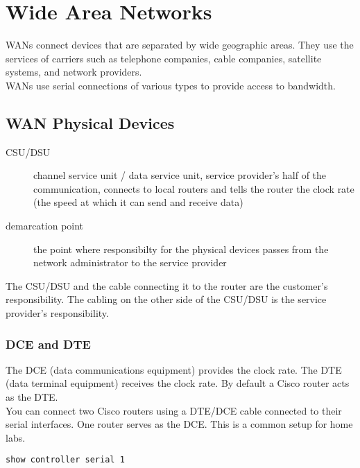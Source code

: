 \section{Wide Area Networks}

WANs connect devices that are separated by wide geographic areas. They use the
services of carriers such as telephone companies, cable companies, satellite
systems, and network providers.\\

WANs use serial connections of various types to provide access to bandwidth.

\subsection{WAN Physical Devices}

\begin{description}

\item[CSU/DSU]
channel service unit / data service unit, service provider's half of the
communication, connects to local routers and tells the router the clock rate
(the speed at which it can send and receive data)

\item[demarcation point]
the point where responsibilty for the physical devices passes from the
network administrator to the service provider
\end{description}

The CSU/DSU and the cable connecting it to the router are the customer's
responsibility. The cabling on the other side of the CSU/DSU is the service
provider's responsibility.

\subsubsection{DCE and DTE}

The DCE (data communications equipment) provides the clock rate. The DTE
(data terminal equipment) receives the clock rate. By default a Cisco
router acts as the DTE.\\

You can connect two Cisco routers using a DTE/DCE cable connected to their
serial interfaces. One router serves as the DCE. This is a common setup
for home labs.

\begin{verbatim}
show controller serial 1  
\end{verbatim}

